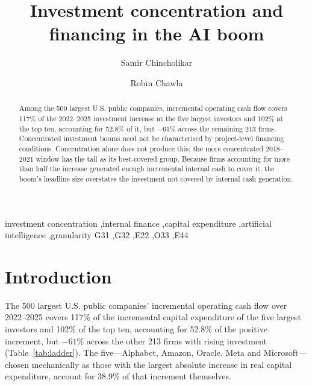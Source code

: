 \documentclass[preprint,11pt]{elsarticle}
\begin{document}
\begin{frontmatter}
\title{Investment concentration and financing in the AI boom}
\author[a]{Samir Chincholikar}
\author[a]{Robin Chawla}
\begin{abstract}
Among the 500 largest U.S. public companies, incremental operating cash flow covers 117\% of the
2022--2025 investment increase at the five largest investors and 102\% at the top ten, accounting
for 52.8\% of it, but $-61$\% across the remaining 213 firms. Concentrated investment booms need not
be characterised by project-level financing conditions. Concentration alone does not produce this:
the more concentrated 2018--2021 window has the tail as its best-covered group. Because firms
accounting for more than half the increase generated enough incremental internal cash to cover it,
the boom's headline size overstates the investment not covered by internal cash generation.
\end{abstract}
\begin{keyword}
investment concentration \sep internal finance \sep capital expenditure \sep artificial
intelligence \sep granularity
\JEL G31 \sep G32 \sep E22 \sep O33 \sep E44
\end{keyword}
\end{frontmatter}


\section{Introduction}
The 500 largest U.S. public companies' incremental operating cash flow over 2022--2025 covers 117\%
of the incremental capital expenditure of the five largest investors and 102\% of the top ten,
accounting for 52.8\% of the positive increment, but $-61$\% across the other 213 firms with rising
investment (Table~\ref{tab:ladder}). The five---Alphabet, Amazon, Oracle, Meta and
Microsoft---chosen mechanically as those with the largest absolute increase in real capital
expenditure, account for 38.9\% of that increment themselves.
\end{document}

